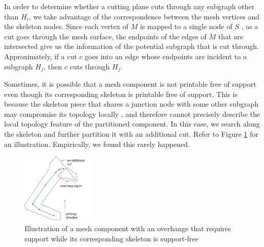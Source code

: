 In order to determine whether a cutting plane cuts through any subgraph other than $H_i$, we take advantage of the correspondence between the mesh vertices and the skeleton nodes. Since each vertex of $M$ is mapped to a single node of $S$ \cite{AuTCCL08}, as a cut goes through the mesh surface, the endpoints of the edges of $M$ that are intersected give us the information of the potential subgraph that is cut through. Approximately, if a cut $c$ goes into an edge whose endpoints are incident to a subgraph $H_j$, then $c$ cuts through $H_j$.

Sometimes, it is possible that a mesh component is not printable free of support even though its corresponding skeleton is printable free of support. This is because the skeleton piece that shares a junction node with some other subgraph may compromise its topology locally \cite{AuTCCL08}, and therefore cannot precisely describe the local topology feature of the partitioned component. In this case, we search along the skeleton and further partition it with an additional cut. Refer to Figure \ref{fig:arm} for an illustration. Empirically, we found this rarely happened.

\begin{figure}[tbp]
  \centering
  \includegraphics[width=0.3\textwidth]{figs/arm.png}
  \caption{\label{fig:arm}%
           Illustration of a mesh component with an overhange that requires support while its corresponding skeleton is support-free}
\end{figure}









